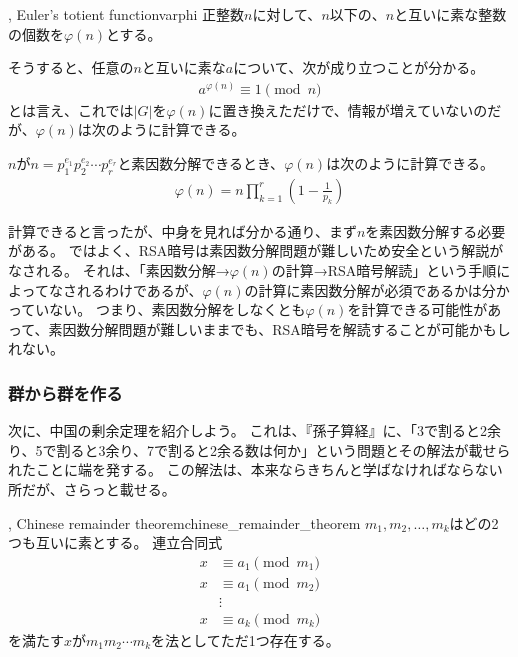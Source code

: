 \begin{Defi}{, Euler's totient function}{varphi}
正整数$n$に対して、$n$以下の、$n$と互いに素な整数の個数を$\varphi(n)$とする。
\end{Defi}

そうすると、任意の$n$と互いに素な$a$について、次が成り立つことが分かる。
\begin{align*}
a^{\varphi(n)} \equiv 1 \pmod{n}
\end{align*}
とは言え、これでは$|G|$を$\varphi(n)$に置き換えただけで、情報が増えていないのだが、$\varphi(n)$は次のように計算できる。

\begin{Theo}{}{}
$n$が$n=p_1^{e_1}p_2^{e_2}\cdots p_r^{e_r}$と素因数分解できるとき、$\varphi(n)$は次のように計算できる。
\begin{align*}
\varphi(n) = n \prod_{k=1}^r \left( 1 - \frac{1}{p_k} \right)
\end{align*}
\end{Theo}


計算できると言ったが、中身を見れば分かる通り、まず$n$を素因数分解する必要がある。
ではよく、RSA暗号は素因数分解問題が難しいため安全という解説がなされる。
それは、「素因数分解→$\varphi(n)$の計算→RSA暗号解読」という手順によってなされるわけであるが、$\varphi(n)$の計算に素因数分解が必須であるかは分かっていない。
つまり、素因数分解をしなくとも$\varphi(n)$を計算できる可能性があって、素因数分解問題が難しいままでも、RSA暗号を解読することが可能かもしれない。

\subsubsection{群から群を作る}
次に、中国の剰余定理を紹介しよう。
これは、『孫子算経』に、「3で割ると2余り、5で割ると3余り、7で割ると2余る数は何か」という問題とその解法が載せられたことに端を発する。
この解法は、本来ならきちんと学ばなければならない所だが、さらっと載せる。

\begin{Theo}{, Chinese remainder theorem}{chinese_remainder_theorem}
$m_1,m_2,\ldots,m_k$はどの2つも互いに素とする。
連立合同式
\begin{align*}
x &\equiv a_1 \pmod{m_1}\\
x &\equiv a_1 \pmod{m_2}\\
&\vdots\\
x &\equiv a_k \pmod{m_k}
\end{align*}
を満たす$x$が$m_1m_2\cdots m_k$を法としてただ1つ存在する。
\end{Theo}

